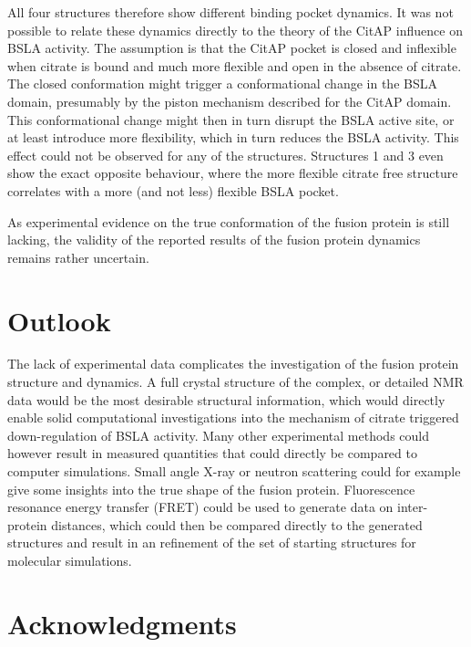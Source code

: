 \documentclass[english, a4paper, 12pt, titlepage, draft]{article}
\begin{document}
All four structures therefore show different binding pocket dynamics.
It was not possible to relate these dynamics directly to the theory of the CitAP influence on BSLA activity.
The assumption is that the CitAP pocket is closed and inflexible when citrate is bound and much more flexible and open in the absence of citrate.
The closed conformation might trigger a conformational change in the BSLA domain, presumably by the piston mechanism described for the CitAP domain.
This conformational change might then in turn disrupt the BSLA active site, or at least introduce more flexibility, which in turn reduces the BSLA activity.
This effect could not be observed for any of the structures.
Structures 1 and 3 even show the exact opposite behaviour, where the more flexible citrate free structure correlates with a more (and not less) flexible BSLA pocket.

As experimental evidence on the true conformation of the fusion protein is still lacking, the validity of the reported results of the fusion protein dynamics remains rather uncertain.



\section{Outlook}

The lack of experimental data complicates the investigation of the fusion protein structure and dynamics.
A full crystal structure of the complex, or detailed NMR data would be the most desirable structural information, which would directly enable solid computational investigations into the mechanism of citrate triggered down-regulation of BSLA activity.
Many other experimental methods could however result in measured quantities that could directly be compared to computer simulations.
Small angle X-ray or neutron scattering could for example give some insights into the true shape of the fusion protein.
Fluorescence resonance energy transfer (FRET) could be used to generate data on inter-protein distances, which could then be compared directly to the generated structures and result in an refinement of the set of starting structures for molecular simulations.



\pagebreak

\section{Acknowledgments} 
\end{document}
